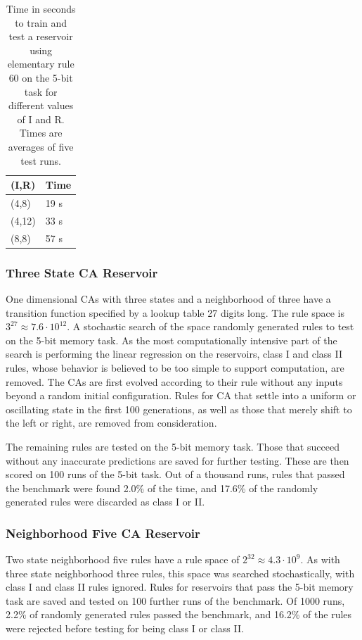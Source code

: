 \documentclass{elsarticle}
\begin{document}
\begin{multicols}{2}
\begin{table}[H] \centering
\begin{tabular}{|l|l|}
\hline
\textbf{(I,R)} & \textbf{Time} \\ \hline
(4,8) & 19 s \\ \hline
(4,12) & 33 s \\ \hline
(8,8) & 57 s \\ \hline
\end{tabular}
\caption{Time in seconds to train and test a reservoir using elementary rule 60 
    on the 5-bit task for different values of I and R. Times are averages of 
        five test runs.}
\label{table:time}
\end{table}

  
\subsubsection{Three State CA Reservoir}
One dimensional CAs with three states and a neighborhood of three have a 
transition function specified by a lookup table 27 digits long. The rule space 
is $3^27 \approx 7.6 \cdot 10^12$. A stochastic search of the space randomly 
generated rules to test on the 5-bit memory task. As the most computationally 
intensive part of the search is performing the linear regression on the 
reservoirs, class I and class II rules, whose behavior is believed to be too 
simple to support computation, are removed. The CAs are first evolved according 
to their rule without any inputs beyond a random initial configuration. Rules 
for CA that settle into a uniform or oscillating state in the first 100 
generations, as well as those that merely shift to the left or right, are 
removed from consideration.\par
The remaining rules are tested on the 5-bit memory task.  Those that succeed 
without any inaccurate predictions are saved for further testing.  These are 
then scored on 100 runs of the 5-bit task.  Out of a thousand runs, rules that 
passed the benchmark were found 2.0\% of the time, and 17.6\% of the randomly 
generated rules were discarded as class I or II.
    
\subsubsection{Neighborhood Five CA Reservoir}
Two state neighborhood five rules have a rule space of $2^32 \approx 4.3 \cdot 
    10^9$. As with three state neighborhood three rules, this space was 
    searched stochastically, with class I and class II rules ignored. Rules for 
    reservoirs that pass the 5-bit memory task are saved and tested on 100 
    further runs of the benchmark. Of 1000 runs, 2.2\% of randomly generated 
    rules passed the benchmark, and 16.2\% of the rules were rejected before 
    testing for being class I or class II.

\end{multicols}
\end{document}
